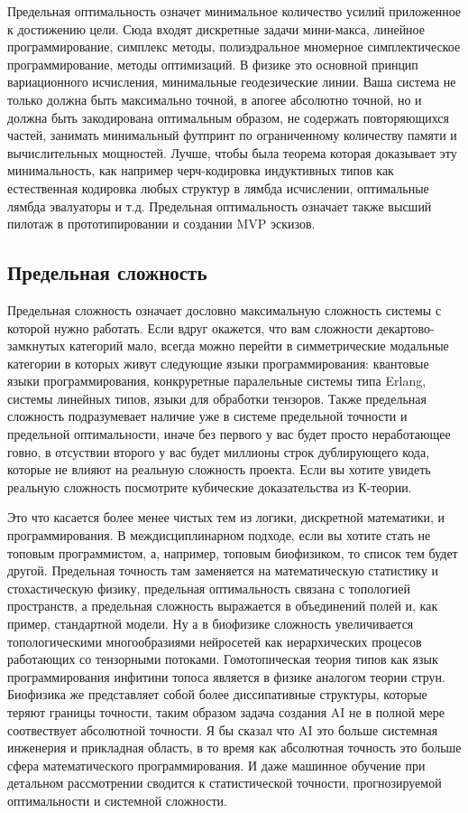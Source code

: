 Предельная оптимальность означет минимальное количество усилий приложенное к достижению цели. Сюда входят дискретные задачи мини-макса, линейное программирование, симплекс методы, полиэдральное мномерное симплектическое программирование, методы оптимизаций. В физике это основной принцип вариационного исчисления, минимальные геодезические линии. Ваша система не только должна быть максимально точной, в апогее абсолютно точной, но и должна быть закодирована оптимальным образом, не содержать повторяющихся частей, занимать минимальный футпринт по ограниченному количеству памяти и вычислительных мощностей. Лучше, чтобы была теорема которая доказывает эту минимальность, как например черч-кодировка индуктивных типов как естественная кодировка любых структур в лямбда исчислении, оптимальные лямбда эвалуаторы и т.д. Предельная оптимальность означает также высший пилотаж в прототипировании и создании MVP эскизов.

\subsection{Предельная сложность}

Предельная сложность означает дословно максимальную сложность системы с которой нужно работать. Если вдруг окажется, что вам сложности декартово-замкнутых категорий мало, всегда можно перейти в симметрические модальные категории в которых живут следующие языки программирования: квантовые языки программирования, конкруретные паралельные системы типа Erlang, системы линейных типов, языки для обработки тензоров. Также предельная сложность подразумевает наличие уже в системе предельной точности и предельной оптимальности, иначе без первого у вас будет просто неработающее говно, в отсуствии второго у вас будет миллионы строк дублирующего кода, которые не влияют на реальную сложность проекта. Если вы хотите увидеть реальную сложность посмотрите кубические доказательства из К-теории.

Это что касается более менее чистых тем из логики, дискретной математики, и программирования. В междисциплинарном подходе, если вы хотите стать не топовым программистом, а, например, топовым биофизиком, то список тем будет другой. Предельная точность там заменяется на математическую статистику и стохастическую физику, предельная оптимальность связана с топологией пространств, а предельная сложность выражается в объединений полей и, как пример, стандартной модели. Ну а в биофизике сложность увеличивается топологическими многообразиями нейросетей как иерархических процесов работающих со тензорными потоками. Гомотопическая теория типов как язык программирования инфитини топоса является в физике аналогом теории струн. Биофизика же представляет собой более диссипативные структуры, которые теряют границы точности, таким образом задача создания AI не в полной мере соотвествует абсолютной точности. Я бы сказал что AI это больше системная инженерия и прикладная область, в то время как абсолютная точность это больше сфера математического программирования. И даже машинное обучение при детальном рассмотрении сводится к статистической точности, прогнозируемой оптимальности и системной сложности.


